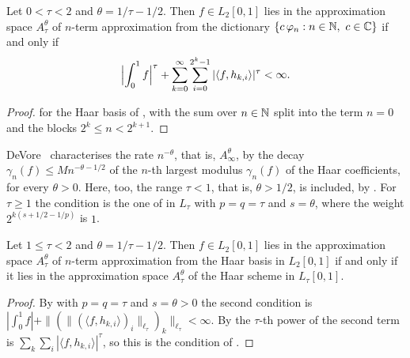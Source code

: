 \begin{theorem}
\label{thm:haar-nterm}
\leanok
{}
Let $0 < \tau < 2$ and $\theta = 1/\tau - 1/2$. Then $f \in L_2[0, 1]$ lies in the
approximation space $A^\theta_\tau$ of $n$-term approximation from the dictionary
$\{c \, \varphi_n : n \in \mathbb{N}, \ c \in \mathbb{C}\}$ if and only if
\[
  \Bigl| \int_0^1 f \Bigr|^\tau
  + \sum_{k=0}^\infty \sum_{i=0}^{2^k - 1} |\langle f, h_{k,i} \rangle|^\tau < \infty .
\]
\end{theorem}

\begin{proof}
\leanok
{} for the Haar basis of , with the sum over $n \in \mathbb{N}$
split into the term $n = 0$ and the blocks $2^k \leq n < 2^{k+1}$.
\end{proof}

DeVore~\cite[\S3.6]{DeVore1998} characterises the rate $n^{-\theta}$, that is,
$A^\theta_\infty$, by the decay $\gamma_n(f) \leq M n^{-\theta-1/2}$ of the $n$-th largest
modulus $\gamma_n(f)$ of the Haar coefficients, for every $\theta > 0$. Here, too, the range
$\tau < 1$, that is, $\theta > 1/2$, is included, by . For $\tau \geq 1$ the
condition is the one of  in $L_\tau$ with $p = q = \tau$ and $s = \theta$, where
the weight $2^{k(s + 1/2 - 1/p)}$ is $1$.

\begin{theorem}
\label{thm:haar-nterm-linear}
\leanok
{}
Let $1 \leq \tau < 2$ and $\theta = 1/\tau - 1/2$. Then $f \in L_2[0, 1]$ lies in the
approximation space $A^\theta_\tau$ of $n$-term approximation from the Haar basis in
$L_2[0, 1]$ if and only if it lies in the approximation space $A^\theta_\tau$ of the Haar scheme
in $L_\tau[0, 1]$.
\end{theorem}

\begin{proof}
\leanok
By  with $p = q = \tau$ and $s = \theta > 0$ the second condition is
$|\int_0^1 f| + \|(\|(\langle f, h_{k,i} \rangle)_i\|_{\ell_\tau})_k\|_{\ell_\tau} < \infty$.
By  the $\tau$-th power of the second term is
$\sum_k \sum_i |\langle f, h_{k,i} \rangle|^\tau$, so this is the condition of
.
\end{proof}

